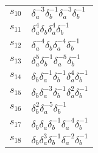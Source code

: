 \documentclass{article}
\begin{document}
\begin{center}
\begin{tabular}{ll}
$s_{10}$ & $\delta_a^{-3}\delta_b^{-1}\delta_a^{-3}\delta_b^{-1}$ \\
$s_{11}$ & $\delta_a^{4}\delta_b^{}\delta_a^{4}\delta_b^{-1}$ \\
$s_{12}$ & $\delta_a^{-4}\delta_b^{}\delta_a^{-4}\delta_b^{-1}$ \\
$s_{13}$ & $\delta_a^{5}\delta_b^{-1}\delta_a^{-5}\delta_b^{-1}$ \\
$s_{14}$ & $\delta_b^{}\delta_a^{-1}\delta_b^{-1}\delta_a^{4}\delta_b^{-1}$ \\
$s_{15}$ & $\delta_b^{}\delta_a^{-3}\delta_b^{-1}\delta_a^{2}\delta_b^{-1}$ \\
$s_{16}$ & $\delta_b^{2}\delta_a^{-5}\delta_b^{-1}$ \\
$s_{17}$ & $\delta_b^{}\delta_a^{}\delta_b^{-1}\delta_a^{-4}\delta_b^{-1}$ \\
$s_{18}$ & $\delta_b^{}\delta_a^{3}\delta_b^{-1}\delta_a^{-2}\delta_b^{-1}$ \\
\bottomrule
\end{tabular}
\end{center}

\thispagestyle{empty}
\end{document}
